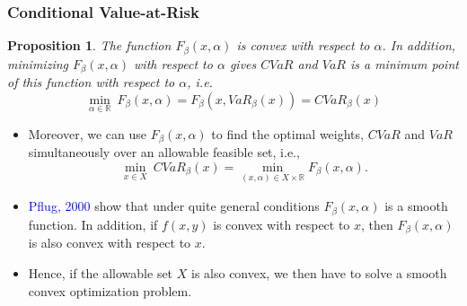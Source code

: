 \documentclass[pdf,10pt,xcolor=dvipsnames,hide notes]{beamer}
\newtheorem{proposition}{Proposition}
\begin{document}
\begin{frame}[label=frame2b6]
	\frametitle{Conditional Value-at-Risk}
	
	\begin{proposition}
			The function $F_{\beta }\left( x,\alpha \right) $ is convex with respect to $%
			\alpha $. In addition, minimizing $F_{\beta }\left( x,\alpha \right) $ with
			respect to $\alpha $ gives $CVaR$ and $VaR$ is a minimum point of this
			function with respect to $\alpha $, i.e.
			\begin{equation}
			\underset{\alpha \in
				\mathbb{R}
			}{\min }~F_{\beta }\left( x,\alpha \right) =F_{\beta }\left( x,VaR_{\beta
			}\left( x\right) \right) =CVaR_{\beta }(x)  \label{seven}
			\end{equation}
		\end{proposition}
		
		\vspace{0.3cm}
		
			\begin{itemize}
			\justifying
			
					\item Moreover, we can use $F_{\beta }\left( x,\alpha \right) $ to find the optimal weights, $CVaR$ and
			$VaR$ simultaneously over an allowable feasible set, i.e.,
			\begin{equation}
			\underset{x\in X}{\min }~CVaR_{\beta }(x)=\underset{}{\underset{\left(
					x,\alpha \right) \in X\times
					\mathbb{R}
				}{\min }F_{\beta }\left( x,\alpha \right) }.  \label{eight}
			\end{equation}
			
			\vspace{0.3cm}
			
			\item \textcolor{blue}{Pflug}, \textcolor{blue}{2000} show that under quite general conditions $F_{\beta
			}\left( x,\alpha \right) $ is a smooth function. In addition, if $f(x,y)$ is
			convex with respect to $x$, then $F_{\beta }\left( x,\alpha \right) $ is
			also convex with respect to $x$. 
			
			\vspace{0.3cm}
			
			\item Hence, if the allowable set $X$ is also
			convex, we then have to solve a smooth convex optimization problem.
			
		\end{itemize}
	
\end{frame}
\end{document}
